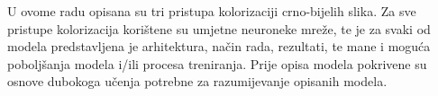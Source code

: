 \begin{sazetak}

U ovome radu opisana su tri pristupa kolorizaciji crno-bijelih slika. 
Za sve pristupe kolorizacija korištene su umjetne neuroneke mreže, te je
za svaki od modela predstavljena je arhitektura, način rada, rezultati, 
te mane i moguća poboljšanja modela i/ili procesa treniranja.
Prije opisa modela pokrivene su osnove dubokoga učenja potrebne za 
razumijevanje opisanih modela.


\end{sazetak}